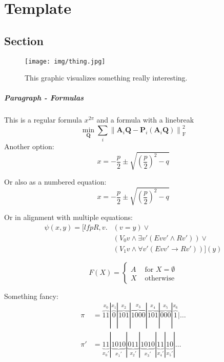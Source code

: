 
\chapter{Template}
\thispagestyle{empty}

\section{Section}
\begin{figure}[htb!]
	\centering
	\texttt{[image: img/thing.jpg]}
	\caption{This graphic visualizes something really interesting.}
	\label{fig:dummy}
\end{figure}
\paragraph{Paragraph - Formulas}
This is a regular formula $ x^{2 \pi}$ and a formula with a linebreak 
\[ \min_{\mathbf{Q}} \sum_i \left\| \mathbf{A}_i \mathbf{Q} - \mathbf{P}_i(\mathbf{A}_i \mathbf{Q}) \right\|^2_\mathrm{F} \]
Another option:
$$
x = -\frac{p}{2} \pm \sqrt{(\frac{p}{2})^2 -q}
$$

Or also as a numbered equation:
\begin{equation}
	x = -\frac{p}{2} \pm \sqrt{(\frac{p}{2})^2 -q}
\end{equation}

Or in alignment with multiple equations:
\begin{align*}
	\psi(x,y) = [lfp R, v. &(v = y) \vee \\
	&(V_0 v \wedge \exists v' (Evv' \wedge Rv')) \vee\\
	&(V_1 v \wedge \forall v' (Evv' \rightarrow Rv'))](y)
\end{align*}

\[F(X) = \begin{cases}
	A & \mbox{ for } X = \emptyset\\
	X & \mbox{ otherwise}
\end{cases}\]

Something fancy:
\begin{align*}
	\pi  &= \overbrace{11}^{x_0}|\overbrace{0}^{x_1}|\overbrace{101}^{x_2}|\overbrace{100 0}^{x_3}|\overbrace{101}^{x_4}|\overbrace{00 0}^{x_5}|\overbrace{1}^{x_6}|\ldots\\
	\pi' &= \underbrace{11}_{x_0'}|\underbrace{1 010}_{x_1'}|\underbrace{011}_{x_2'}|\underbrace{1 010}_{x_3'}|\underbrace{11}_{x_4'}|\underbrace{1 0}_{x_5'}|\ldots
\end{align*}

